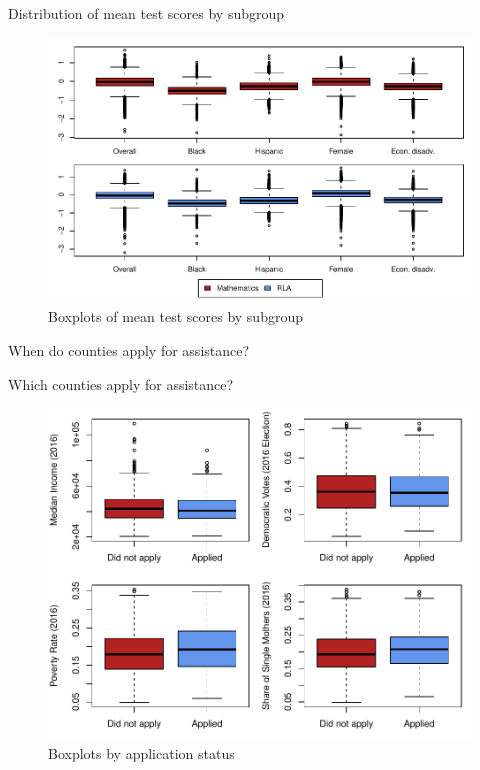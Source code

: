 \documentclass[hyperref={colorlinks = true,linkcolor = blue, citecolor=blue,urlcolor=blue}]{beamer}
\begin{document}
\begin{frame}{Distribution of mean test scores by subgroup}
	\begin{figure}[!h]
		\centering
		\includegraphics[scale=0.68]{"../Code & Data/DepVarsBoxplot.pdf"}
		\caption{Boxplots of mean test scores by subgroup}
		\label{DepVarsBoxplot}
	\end{figure}
\end{frame}

\begin{frame}{When do counties apply for assistance?}
	\small
	
\end{frame}

\begin{frame}{Which counties apply for assistance?}
	\begin{figure}[!h]
		\centering
		\includegraphics[scale=0.58]{"../Code & Data/AssistanceCovBoxplot.pdf"}
		\caption{Boxplots by application status}
		\label{AssistCovBoxplot}
	\end{figure}
\end{frame}
\end{document}
